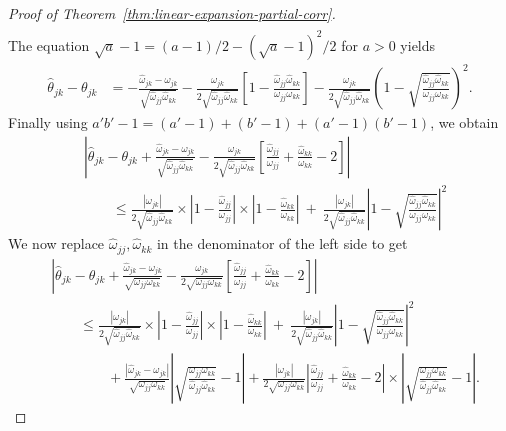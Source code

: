 \documentclass[11pt]{article}
\begin{document}
\begin{appendices}
\begin{proof}[Proof of Theorem~\ref{thm:linear-expansion-partial-corr}]
\begin{align*}
\end{align*}
The equation $\sqrt{a} - 1 = (a-1)/2 - (\sqrt{a} - 1)^2/2$ for $a > 0$ yields
\begin{align*}
\widehat{\theta}_{jk} - \theta_{jk} &= -\frac{\widehat{\omega}_{jk} - \omega_{jk}}{\sqrt{\widehat{\omega}_{jj}\widehat{\omega}_{kk}}} - \frac{\omega_{jk}}{2\sqrt{\widehat{\omega}_{jj}\widehat{\omega}_{kk}}}\left[1 - \frac{\widehat{\omega}_{jj}\widehat{\omega}_{kk}}{\omega_{jj}\omega_{kk}}\right] - \frac{\omega_{jk}}{2\sqrt{\widehat{\omega}_{jj}\widehat{\omega}_{kk}}}\left(1 - \sqrt{\frac{\widehat{\omega}_{jj}\widehat{\omega}_{kk}}{\omega_{jj}\omega_{kk}}}\right)^2.
\end{align*}
Finally using $a'b' - 1 = (a' - 1) + (b' - 1) + (a' - 1)(b' - 1)$, we obtain
\begin{align*}
&\left|\widehat{\theta}_{jk} - \theta_{jk} + \frac{\widehat{\omega}_{jk} - \omega_{jk}}{\sqrt{\widehat{\omega}_{jj}\widehat{\omega}_{kk}}} - \frac{\omega_{jk}}{2\sqrt{\widehat{\omega}_{jj}\widehat{\omega}_{kk}}}\left[\frac{\widehat{\omega}_{jj}}{\omega_{jj}} + \frac{\widehat{\omega}_{kk}}{\omega_{kk}} - 2\right]\right|\\
&\qquad\le \frac{|\omega_{jk}|}{2\sqrt{\widehat{\omega}_{jj}\widehat{\omega}_{kk}}}\times\left|1 - \frac{\widehat{\omega}_{jj}}{\omega_{jj}}\right|\times\left|1 - \frac{\widehat{\omega}_{kk}}{\omega_{kk}}\right| ~+~ \frac{|\omega_{jk}|}{2\sqrt{\widehat{\omega}_{jj}\widehat{\omega}_{kk}}}\left|1 - \sqrt{\frac{\widehat{\omega}_{jj}\widehat{\omega}_{kk}}{\omega_{jj}\omega_{kk}}}\right|^2
\end{align*}
We now replace $\widehat{\omega}_{jj}, \widehat{\omega}_{kk}$ in the denominator of the left side to get
\begin{align*}
&\left|\widehat{\theta}_{jk} - \theta_{jk} + \frac{\widehat{\omega}_{jk} - \omega_{jk}}{\sqrt{{\omega}_{jj}{\omega}_{kk}}} - \frac{\omega_{jk}}{2\sqrt{{\omega}_{jj}{\omega}_{kk}}}\left[\frac{\widehat{\omega}_{jj}}{\omega_{jj}} + \frac{\widehat{\omega}_{kk}}{\omega_{kk}} - 2\right]\right|\\
&\qquad\le \frac{|\omega_{jk}|}{2\sqrt{\widehat{\omega}_{jj}\widehat{\omega}_{kk}}}\times\left|1 - \frac{\widehat{\omega}_{jj}}{\omega_{jj}}\right|\times\left|1 - \frac{\widehat{\omega}_{kk}}{\omega_{kk}}\right| ~+~ \frac{|\omega_{jk}|}{2\sqrt{\widehat{\omega}_{jj}\widehat{\omega}_{kk}}}\left|1 - \sqrt{\frac{\widehat{\omega}_{jj}\widehat{\omega}_{kk}}{\omega_{jj}\omega_{kk}}}\right|^2\\
&\qquad\qquad+ \frac{|\widehat{\omega}_{jk} - \omega_{jk}|}{\sqrt{\omega_{jj}\omega_{kk}}}\left|\sqrt{\frac{\omega_{jj}\omega_{kk}}{{\widehat{\omega}_{jj}\widehat{\omega}_{kk}}}} - 1\right| + \frac{|\omega_{jk}|}{2\sqrt{\omega_{jj}\omega_{kk}}}\left|\frac{\widehat{\omega}_{jj}}{\omega_{jj}} + \frac{\widehat{\omega}_{kk}}{\omega_{kk}} - 2\right|\times\left|\sqrt{\frac{\omega_{jj}\omega_{kk}}{{\widehat{\omega}_{jj}\widehat{\omega}_{kk}}}} -  1\right|. 

\end{align*}
\end{proof}
\end{appendices}
\end{document}
